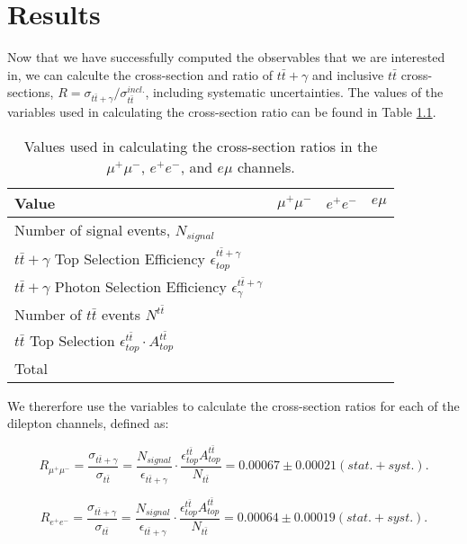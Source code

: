 \chapter{Results} \label{chap-Results}

Now that we have successfully computed the observables that we are interested in, we can calculte the cross-section and ratio of $t\bar{t}+\gamma$ and inclusive $t\bar{t}$ cross-sections, $R = \sigma_{t\bar{t}+\gamma}/\sigma_{t\bar{t}}^{incl.}$, including systematic uncertainties. The values of the variables used in calculating the cross-section ratio can be found in Table \ref{tab-xsectvariables}.

\begin{table}[h!]
\begin{center}
\begin{tabular}{l|c|c|c}
\hline
	\textbf{Value} & $\mu^+\mu^-$ & $e^+e^-$ & $e\mu$ \\
\hline
	Number of signal events, $N_{signal}$ & & & \\
	$t\bar{t}+\gamma$ Top Selection Efficiency $\epsilon^{t\bar{t}+\gamma}_{top}$ & & & \\
	$t\bar{t}+\gamma$ Photon Selection Efficiency $\epsilon^{t\bar{t}+\gamma}_{\gamma}$ & & & \\
	Number of $t\bar{t}$ events $N^{t\bar{t}}$ & & & \\
	$t\bar{t}$ Top Selection $\epsilon^{t\bar{t}}_{top} \cdot A^{t\bar{t}}_{top}$ & & & \\
\hline
	Total & & & \\
\hline
\end{tabular} 
\end{center}
\caption{Values used in calculating the cross-section ratios in the $\mu^+\mu^-$, $e^+e^-$, and $e\mu$ channels.}
\label{tab-xsectvariables}
\end{table}

We thererfore use the variables to calculate the cross-section ratios for each of the dilepton channels, defined as:

\begin{equation}
	R_{\mu^+\mu^-} = \frac{\sigma_{t\bar{t}+\gamma}}{\sigma_{t\bar{t}}} = \frac{N_{signal}}{\epsilon_{t\bar{t}+\gamma}} \cdot \frac{\epsilon^{t\bar{t}}_{top} A^{t\bar{t}}_{top}}{N_{t\bar{t}}} = 0.00067 \pm 0.00021 (stat. + syst.).
\end{equation}

\begin{equation}
	R_{e^+e^-} = \frac{\sigma_{t\bar{t}+\gamma}}{\sigma_{t\bar{t}}} = \frac{N_{signal}}{\epsilon_{t\bar{t}+\gamma}} \cdot \frac{\epsilon^{t\bar{t}}_{top} A^{t\bar{t}}_{top}}{N_{t\bar{t}}} = 0.00064 \pm 0.00019 (stat. + syst.).
\end{equation}

